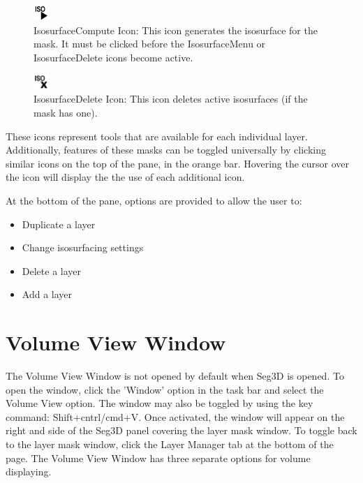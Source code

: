 \documentclass[fleqn,11pt,openany]{book}
\begin{document}
\begin{figure}
\vspace{12 pt}
  \includegraphics[width=0.05\textwidth]{Seg3DBasicFunctionality_figures/IsosurfaceComputeOff.png}%
  \caption{IsosurfaceCompute Icon: This icon generates the isosurface for the mask.  It must be clicked before the IsosurfaceMenu or IsosurfaceDelete icons become active.}
\end{figure}

\begin{figure}
\vspace{3 pt}
  \includegraphics[width=0.05\textwidth]{Seg3DBasicFunctionality_figures/IsosurfaceDeleteOff.png}%
  \caption{IsosurfaceDelete Icon: This icon deletes active isosurfaces (if the mask has one).}
\end{figure}

These icons represent tools that are available for each individual layer.  
Additionally, features of these masks can be toggled universally by clicking similar icons on the top of the pane, in the orange bar.  
Hovering the cursor over the icon will display the the use of each additional icon.

At the bottom of the pane, options are provided to allow the user to: 
\begin{itemize}
\item Duplicate a layer
\item Change isosurfacing settings
\item Delete a layer
\item Add a layer
\end{itemize}


\section{Volume View Window}
The Volume View Window is not opened by default when Seg3D is opened.  
To open the window, click the 'Window' option in the task bar and select the Volume View option.  
The window may also be toggled by using the key command: Shift+cntrl/cmd+V. 
Once activated, the window will appear on the right and side of the Seg3D panel covering the layer mask window.
To toggle back to the layer mask window, click the Layer Manager tab at the bottom of the page.
The Volume View Window has three separate options for volume displaying.
\end{document}
